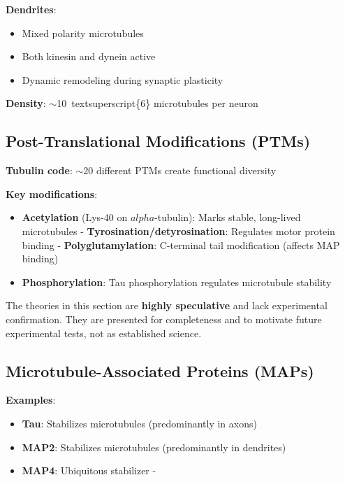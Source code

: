 \textbf{Dendrites}:
\begin{itemize}
\item Mixed polarity microtubules
\item Both kinesin and
dynein active
\item Dynamic remodeling during synaptic plasticity
\end{itemize}


\textbf{Density}: $\sim$10\ textsuperscript\{6\}
microtubules per neuron

\subsection{Post-Translational Modifications
(PTMs)}\label{post-translational-modifications-ptms}

\textbf{Tubulin code}: $\sim$20 different PTMs create
functional diversity

\textbf{Key modifications}:
\begin{itemize}
\item \textbf{Acetylation} (Lys-40 on
$alpha$-tubulin): Marks stable, long-lived microtubules
- \textbf{Tyrosination/detyrosination}: Regulates motor protein binding
- \textbf{Polyglutamylation}: C-terminal tail modification (affects MAP
binding)
\item \textbf{Phosphorylation}: Tau phosphorylation regulates
microtubule stability
\end{itemize}


\begin{warningbox}
The theories in this section are \textbf{highly speculative} and lack experimental confirmation. They are presented for completeness and to motivate future experimental tests, not as established science.
\end{warningbox}

\subsection{Microtubule-Associated Proteins
(MAPs)}\label{microtubule-associated-proteins-maps}

\textbf{Examples}:
\begin{itemize}
\item \textbf{Tau}: Stabilizes microtubules
(predominantly in axons)
\item \textbf{MAP2}: Stabilizes microtubules
(predominantly in dendrites)
\item \textbf{MAP4}: Ubiquitous stabilizer -
\end{itemize}

